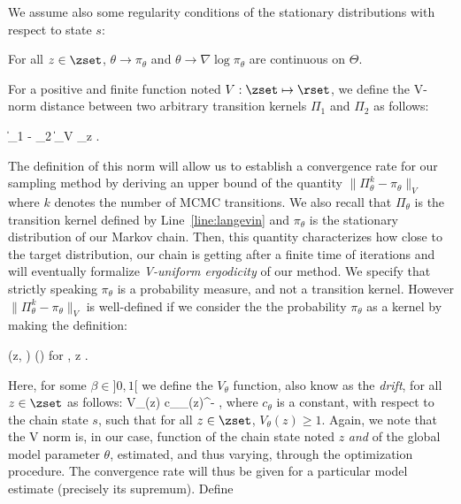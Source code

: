 \documentclass[10pt,twocolumn,letterpaper]{article}
\begin{document}
We assume also some regularity conditions of the stationary distributions with respect to state $s$:
\begin{assumption}\label{ass:contlogpi}
For all $z \in \zset$, $\theta \to \pi_\theta$ and $\theta \to \nabla \log \pi_\theta$ are continuous on $\Theta$.
\end{assumption}

For a positive and finite function noted $V: \zset \mapsto \rset$, we define the V-norm distance between two arbitrary transition kernels $\Pi_1$ and $\Pi_2$ as follows:

\beq\notag
\| \Pi_1 - \Pi_2 \|_V \eqdef \sup \limits_{z \in \zset}  \eqsp.
\eeq

The definition of this norm will allow us to establish a convergence rate for our sampling method by deriving an upper bound of the quantity $\| \Pi_\theta^k - \pi_\theta \|_V$ where $k$ denotes the number of MCMC transitions.
We also recall that $\Pi_\theta$ is the transition kernel defined by Line~\ref{line:langevin} and $\pi_\theta$ is the stationary distribution of our Markov chain. 
Then, this quantity characterizes how close to the target distribution, our chain is getting after a finite time of iterations and will eventually formalize \emph{V-uniform ergodicity} of our method.
We specify that strictly speaking $\pi_\theta$ is a probability measure, and not a transition kernel. However $\| \Pi_\theta^k - \pi_\theta \|_V$ is well-defined if we consider the the probability $\pi_\theta$ as a kernel by making the definition:

\beq\notag
\pi(z, ) \eqdef \pi() \quad \textrm{for} \quad {} \subset \zset, \quad z \in \zset \eqsp.
\eeq


Here, for some $\beta \in ] 0,1[$ we define the $V_\theta$ function, also know as the \emph{drift}, for all $z \in \zset$ as follows: 
\beq\label{eq:driftfunction}
V_\theta(z) \eqdef c_\theta \pi_\theta(z)^{-\beta} \eqsp,
\eeq
where $c_\theta$ is a constant, with respect to the chain state $s$, such that for all $z \in \zset$, $V_\theta(z) \geq 1$.
Again, we note that the V norm is, in our case, function of the chain state noted $z$ \emph{and} of the global model parameter $\theta$, estimated, and thus varying, through the optimization procedure.
The convergence rate will thus be given for a particular model estimate (precisely its supremum).
Define 
\end{document}
